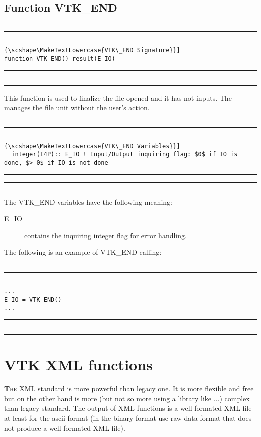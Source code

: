 \documentclass[pagesize=pdftex,fontsize=10pt,paper=a4,oneside]{scrbook}
\DeclareRobustCommand{\MarginNote}[1]{\marginpar{%
\slshape\footnotesize%
\parindent=0pt\lineskip=0pt\lineskiplimit=0pt%
\tolerance=2000\hyphenpenalty=300\exhyphenpenalty=300%
\doublehyphendemerits=100000\finalhyphendemerits=\doublehyphendemerits%
\raggedright\hspace{0pt}#1}}
\newenvironment{boxred}[1]%
               {%
                \noindent\hspace*{-0.025\textwidth}%
                \color{Maroon}%
                \rule[-5.8pt]{0.6pt}{6pt}\hspace*{-0.6pt}\rule{1.05\textwidth}{0.6pt}\hspace*{-0.6pt}\rule[-5.8pt]{0.6pt}{6pt}%
                \color{black}%
                \vspace*{0.6pt}\MarginNote{\color{Maroon}{#1}}%
               }%
               {%
                \noindent\hspace*{-0.025\textwidth}%
                \color{Maroon}%
                \rule[0pt]{0.6pt}{6pt}\hspace*{-0.6pt}\rule{1.05\textwidth}{0.6pt}\hspace*{-0.6pt}\rule[0pt]{0.6pt}{6pt}%
                \color{black}%
                \vspace*{2mm}%
               }
\DeclareRobustCommand{\MaiuscolettoBS}[1]{\textls[80]{\scshape\MakeTextLowercase{#1}}}
\begin{document}
\section{Function VTK\_END}
\label{fun:VTK_END}
 
 
\begin{boxred}{}
\begin{lstlisting}[style=signature,title=\color{Maroon}\MaiuscolettoBS{VTK\_END Signature}]
function VTK_END() result(E_IO)
\end{lstlisting}
\end{boxred}
 
This function is used to finalize the file opened and it has not inputs. The \LIBVTKIO manages the file unit without the
user's action.


 
\begin{boxred}{}
\begin{lstlisting}[style=variables,title=\color{Maroon}\MaiuscolettoBS{VTK\_END Variables}]
  integer(I4P):: E_IO ! Input/Output inquiring flag: $0$ if IO is done, $> 0$ if IO is not done
\end{lstlisting}

\end{boxred}
 
The VTK\_END variables have the following meaning:

\begin{description}
 \item[{\color{RoyalBlue}E\_IO}] contains the inquiring integer flag for error handling.
\end{description}

The following is an example of VTK\_END calling:

\begin{boxred}{VTK\_END Calling}
\begin{verbatim}
...
E_IO = VTK_END()
...
\end{verbatim}
\end{boxred}


\chapter{VTK XML functions}
\minitoc
\vspace*{8mm}

\lettrine[lines=2,loversize=-.1,lraise=0.2]{{\bf T}}{he} XML standard is more powerful than legacy one. It is more flexible
and free but on the other hand is more (but not so more using a library like \LIBVTKIO...) complex than legacy standard. The
output of XML functions is a well-formated XML file at least for the ascii format (in the binary format \LIBVTKIO use
raw-data format that does not produce a well formated XML file).
\end{document}
